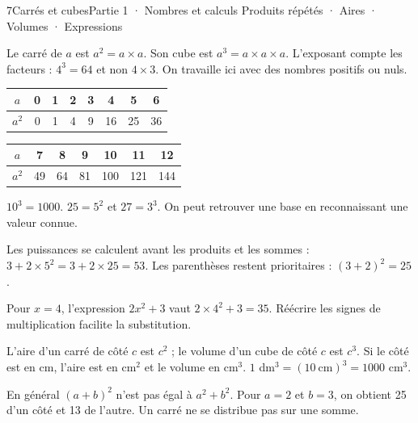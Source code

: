 \begin{ouverture}[calcul]{7}{Carrés et cubes}{Partie 1 · Nombres et calculs}
{Produits répétés · Aires · Volumes · Expressions}
\end{ouverture}
\pagestyle{otMain}\essentiel\fontsize{11}{15}\selectfont
{}\label{cours-7-1}
\begin{definition}Le carré de $a$ est $a^2=a\times a$. Son cube est $a^3=a\times a\times a$. L’exposant compte les facteurs : $4^3=64$ et non $4\times3$. On travaille ici avec des nombres positifs ou nuls.\end{definition}
\label{fig-cours-7-1-cours-carre-cube}

\begin{center}\renewcommand{\arraystretch}{1.35}\begin{tabular}{c|ccccccc}\toprule
$a$ & 0 & 1 & 2 & 3 & 4 & 5 & 6\\\midrule
$a^2$ & 0 & 1 & 4 & 9 & 16 & 25 & 36\\
\bottomrule\end{tabular}\end{center}\begin{center}\renewcommand{\arraystretch}{1.35}\begin{tabular}{c|cccccc}\toprule
$a$ & 7 & 8 & 9 & 10 & 11 & 12\\\midrule
$a^2$ & 49 & 64 & 81 & 100 & 121 & 144\\
\bottomrule\end{tabular}\end{center}
\begin{exemple}$10^3=1000$. $25=5^2$ et $27=3^3$. On peut retrouver une base en reconnaissant une valeur connue.\end{exemple}
\clearpage
{}\label{cours-7-2}
\begin{propriete}Les puissances se calculent avant les produits et les sommes : $3+2\times5^2=3+2\times25=53$. Les parenthèses restent prioritaires : $(3+2)^2=25$.\end{propriete}
\begin{exemple}Pour $x=4$, l’expression $2x^2+3$ vaut $2\times4^2+3=35$. Réécrire les signes de multiplication facilite la substitution.\end{exemple}
\begin{savoirfaire}L’aire d’un carré de côté $c$ est $c^2$ ; le volume d’un cube de côté $c$ est $c^3$. Si le côté est en cm, l’aire est en cm$^2$ et le volume en cm$^3$. $1$ dm$^3=(10\ \mathrm{cm})^3=1000$ cm$^3$.\end{savoirfaire}
\begin{attention}En général $(a+b)^2$ n’est pas égal à $a^2+b^2$. Pour $a=2$ et $b=3$, on obtient 25 d’un côté et 13 de l’autre. Un carré ne se distribue pas sur une somme.\end{attention}

